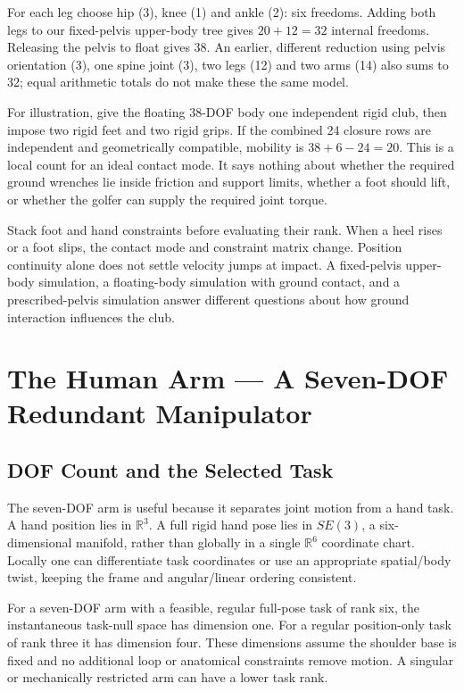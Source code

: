 For each leg choose hip (3), knee (1) and ankle (2): six freedoms. Adding both legs to our fixed-pelvis upper-body tree gives $20+12=32$ internal freedoms. Releasing the pelvis to float gives 38. An earlier, different reduction using pelvis orientation (3), one spine joint (3), two legs (12) and two arms (14) also sums to 32; equal arithmetic totals do not make these the same model.

For illustration, give the floating 38-DOF body one independent rigid club, then impose two rigid feet and two rigid grips. If the combined 24 closure rows are independent and geometrically compatible, mobility is $38+6-24=20$. This is a local count for an ideal contact mode. It says nothing about whether the required ground wrenches lie inside friction and support limits, whether a foot should lift, or whether the golfer can supply the required joint torque.

Stack foot and hand constraints before evaluating their rank. When a heel rises or a foot slips, the contact mode and constraint matrix change. Position continuity alone does not settle velocity jumps at impact. A fixed-pelvis upper-body simulation, a floating-body simulation with ground contact, and a prescribed-pelvis simulation answer different questions about how ground interaction influences the club.

\section{The Human Arm --- A Seven-DOF Redundant Manipulator}
\label{sec:arm_redundancy}

\subsection{DOF Count and the Selected Task}

The seven-DOF arm is useful because it separates joint motion from a hand task. A hand position lies in $\mathbb R^3$. A full rigid hand pose lies in $SE(3)$, a six-dimensional manifold, rather than globally in a single $\mathbb R^6$ coordinate chart. Locally one can differentiate task coordinates or use an appropriate spatial/body twist, keeping the frame and angular/linear ordering consistent.

For a seven-DOF arm with a feasible, regular full-pose task of rank six, the instantaneous task-null space has dimension one. For a regular position-only task of rank three it has dimension four. These dimensions assume the shoulder base is fixed and no additional loop or anatomical constraints remove motion. A singular or mechanically restricted arm can have a lower task rank.

